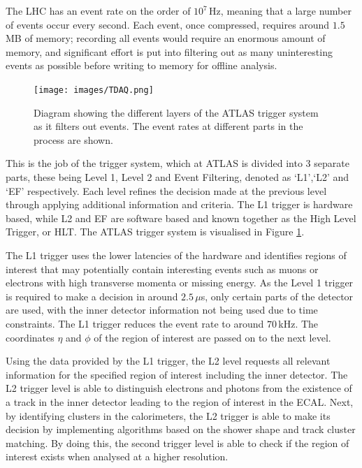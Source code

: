 \documentclass{article}
\begin{document}
The LHC has an event rate on the order of $10^7\,$Hz, meaning that a large number of events occur every second. Each event, once compressed, requires around $1.5\,$MB of memory; recording all events would require an enormous amount of memory, and significant effort is put into filtering out as many uninteresting events as possible before writing to memory for offline analysis.

\begin{figure}[h]
    \centering
    \texttt{[image: images/TDAQ.png]}
    \caption{ Diagram showing the different layers of the ATLAS trigger system as it filters out events. The event rates at different parts in the process are shown.\label{fig:TDAQ} }
\end{figure}

This is the job of the trigger system, which at ATLAS is divided into 3 separate parts, these being Level 1, Level 2 and Event Filtering, denoted as `L1',`L2' and `EF' respectively.  Each level refines the decision made at the previous level through applying additional information and criteria. The L1 trigger is hardware based, while L2 and EF are software based and known together as the High Level Trigger, or HLT. The ATLAS trigger system is visualised in Figure \ref{fig:TDAQ}.

The L1 trigger uses the lower latencies of the hardware and identifies regions of interest that may potentially contain interesting events such as muons or electrons with high transverse momenta or missing energy. As the Level 1 trigger is required to make a decision in around $2.5\,\mu$s, only certain parts of the detector are used, with the inner detector information not being used due to time constraints. The L1 trigger reduces the event rate to around $70\,$kHz. The coordinates $\eta$ and $\phi$ of the region of interest are passed on to the next level.

Using the data provided by the L1 trigger, the L2 level requests all relevant information for the specified region of interest including the inner detector. The L2 trigger level is able to distinguish electrons and photons from the existence of a track in the inner detector leading to the region of interest in the ECAL. Next, by identifying clusters in the calorimeters, the L2 trigger is able to make its decision by implementing algorithms based on the shower shape and track cluster matching. By doing this, the second trigger level is able to check if the region of interest exists when analysed at a higher resolution.
\end{document}
